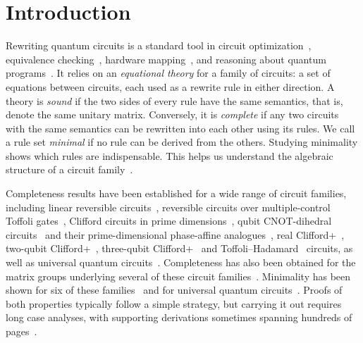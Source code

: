 \documentclass[acmsmall,screen,nonacm]{acmart}
\begin{document}
\maketitle



\section{Introduction}
\label{sec:intro}
Rewriting quantum circuits is a standard tool in circuit optimization~\cite{hietala2021voqc,nam2018automated,maslov2008simplification,xu2022quartz}, equivalence checking~\cite{yamashita2010fast}, hardware mapping~\cite{sivarajah2020tket}, and reasoning about quantum programs~\cite{fang2026hadamard}. It relies on an \emph{equational theory} for a family of circuits: a set of equations between circuits, each used as a rewrite rule in either direction. A theory is \emph{sound} if the two sides of every rule have the same semantics, that is, denote the same unitary matrix. Conversely, it is \emph{complete} if any two circuits with the same semantics can be rewritten into each other using its rules. We call a rule set \emph{minimal} if no rule can be derived from the others. Studying minimality shows which rules are indispensable. This helps us understand the algebraic structure of a circuit family~\cite{blake2026simpler,clement2024minimal}.


Completeness results have been established for a wide range of circuit families, including linear reversible circuits~\cite{lafont2003boolean,sakashita2013cnot}, reversible circuits over multiple-control Toffoli gates~\cite{feng2026complete}, Clifford circuits in prime dimensions~\cite{selinger2015clifford,makary2021real,li2025qutrit,bian2026qupit}, qubit CNOT-dihedral circuits~\cite{amy2018cnotdihedral} and their prime-dimensional phase-affine analogues~\cite{blake2026phaseaffine}, real Clifford+\CH~\cite{clement2026realcliffordch}, two-qubit Clifford+\T~\cite{bian2023cliffordt2}, three-qubit Clifford+\CS~\cite{bian2023cliffordcs3} and Toffoli--Hadamard~\cite{amy2024toffoli} circuits, as well as universal quantum circuits~\cite{clement2023complete,clement2024extensions}. Completeness has also been obtained for the matrix groups underlying several of these circuit families~\cite{greylyn2014,bian2021un,li2021on,fang2026hadamard,clement2019thesis}. Minimality has been shown for six of these families~\cite{blake2026simpler} and for universal quantum circuits~\cite{clement2024minimal}. Proofs of both properties typically follow a simple strategy, but carrying it out requires long case analyses, with supporting derivations sometimes spanning hundreds of pages~\cite{fang2026hadamard,li2025qutrit,clement2026realcliffordch}.
\end{document}
